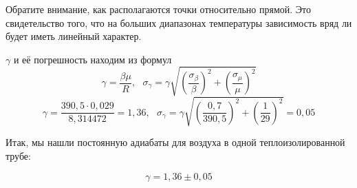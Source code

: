 \documentclass[12pt]{article}
\begin{document}
Обратите внимание, как располагаются точки относительно прямой. Это свидетельство того, что на больших диапазонах температуры зависимость вряд ли будет иметь линейный характер.

$\gamma$ и её погрешность находим из формул
$$\gamma = \frac{\beta \mu}{R},~~~\sigma_\gamma = \gamma\sqrt{(\frac{\sigma_\beta}{\beta})^2 + (\frac{\sigma_\mu}{\mu})^2}$$
$$\gamma = \frac{390,5 \cdot 0,029}{8,314472} = 1,36,~~~\sigma_\gamma = \gamma\sqrt{(\frac{0,7}{390,5})^2 + (\frac{1}{29})^2} = 0,05$$

Итак, мы нашли постоянную адиабаты для воздуха в одной теплоизолированной трубе:

$$\gamma = 1,36 \pm 0,05$$
\end{document}
